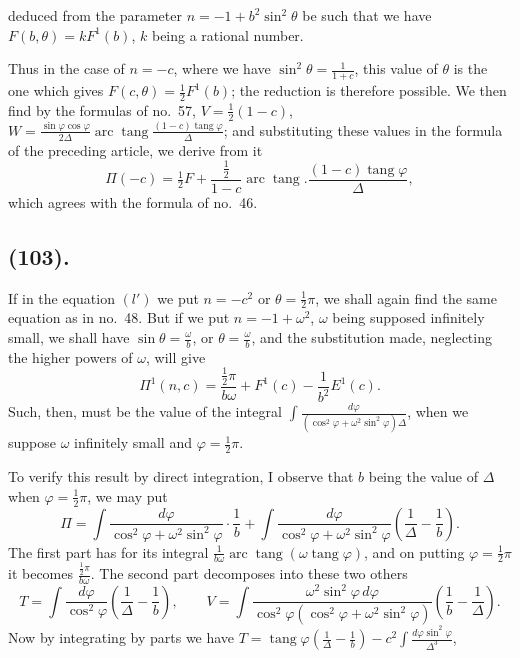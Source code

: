 \documentclass{article}
\begin{document}
deduced from the parameter $n=-1+b^{2}\sin^{2}\theta$ be such that we have $F(b,\theta)=kF^{1}(b)$, $k$ being a rational number.

Thus in the case of $n=-c$, where we have $\sin^{2}\theta=\frac{1}{1+c}$, this value of $\theta$ is the one which gives $F(c,\theta)=\frac{1}{2}F^{1}(b)$; the reduction is therefore possible. We then find by the formulas of no.\ 57, $V=\frac{1}{2}(1-c)$, $W=\frac{\sin\varphi\cos\varphi}{2\Delta}\operatorname{arc}\operatorname{tang}\frac{(1-c)\operatorname{tang}\varphi}{\Delta}$; and substituting these values in the formula of the preceding article, we derive from it
\[ \Pi(-c)=\tfrac{1}{2}F+\frac{\frac{1}{2}}{1-c}\operatorname{arc}\operatorname{tang}.\frac{(1-c)\operatorname{tang}\varphi}{\Delta}, \]
which agrees with the formula of no.\ 46.

\subsection*{(103).}

If in the equation $(l')$ we put $n=-c^{2}$ or $\theta=\frac{1}{2}\pi$, we shall again find the same equation as in no.\ 48. But if we put $n=-1+\omega^{2}$, $\omega$ being supposed infinitely small, we shall have $\sin\theta=\frac{\omega}{b}$, or $\theta=\frac{\omega}{b}$, and the substitution made, neglecting the higher powers of $\omega$, will give
\[ \Pi^{1}(n,c)=\frac{\frac{1}{2}\pi}{b\omega}+F^{1}(c)-\frac{1}{b^{2}}E^{1}(c). \]
Such, then, must be the value of the integral $\displaystyle\int\frac{d\varphi}{(\cos^{2}\varphi+\omega^{2}\sin^{2}\varphi)\Delta}$, when we suppose $\omega$ infinitely small and $\varphi=\frac{1}{2}\pi$.

To verify this result by direct integration, I observe that $b$ being the value of $\Delta$ when $\varphi=\frac{1}{2}\pi$, we may put
\[ \Pi=\int\frac{d\varphi}{\cos^{2}\varphi+\omega^{2}\sin^{2}\varphi}\cdot\frac{1}{b}+\int\frac{d\varphi}{\cos^{2}\varphi+\omega^{2}\sin^{2}\varphi}\left(\frac{1}{\Delta}-\frac{1}{b}\right). \]
The first part has for its integral $\frac{1}{b\omega}\operatorname{arc}\operatorname{tang}(\omega\operatorname{tang}\varphi)$, and on putting $\varphi=\frac{1}{2}\pi$ it becomes $\frac{\frac{1}{2}\pi}{b\omega}$. The second part decomposes into these two others
\[ T=\int\frac{d\varphi}{\cos^{2}\varphi}\left(\frac{1}{\Delta}-\frac{1}{b}\right),\qquad V=\int\frac{\omega^{2}\sin^{2}\varphi\,d\varphi}{\cos^{2}\varphi(\cos^{2}\varphi+\omega^{2}\sin^{2}\varphi)}\left(\frac{1}{b}-\frac{1}{\Delta}\right). \]
Now by integrating by parts we have $T=\operatorname{tang}\varphi\left(\frac{1}{\Delta}-\frac{1}{b}\right)-c^{2}\displaystyle\int\frac{d\varphi\sin^{2}\varphi}{\Delta^{3}}$,
\end{document}
